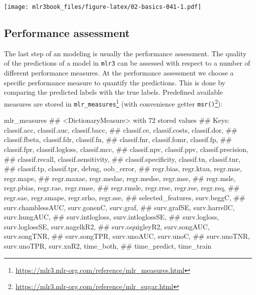 \documentclass[12pt,]{scrbook}
\newenvironment{Shaded}{}{}
\newcommand{\NormalTok}[1]{#1}
\renewcommand{\href}[2]{#2\footnote{\url{#1}}}
\begin{document}
\texttt{[image: mlr3book\_files/figure-latex/02-basics-041-1.pdf]}

\hypertarget{measure}{%
\subsection{Performance assessment}\label{measure}}

The last step of an modeling is usually the performance assessment.
The quality of the predictions of a model in \texttt{mlr3} can be assessed with respect to a number of different performance measures.
At the performance assessment we choose a specific performance measure to quantify the predictions.
This is done by comparing the predicted labels with the true labels.
Predefined available measures are stored in \href{https://mlr3.mlr-org.com/reference/mlr_measures.html}{\texttt{mlr\_measures}} (with convenience getter \href{https://mlr3.mlr-org.com/reference/mlr_sugar.html}{\texttt{msr()}}):

\begin{Shaded}
\begin{Highlighting}[]
\NormalTok{mlr_measures}
\NormalTok{## <DictionaryMeasure> with 72 stored values}
\NormalTok{## Keys: classif.acc, classif.auc, classif.bacc,}
\NormalTok{##   classif.ce, classif.costs, classif.dor,}
\NormalTok{##   classif.fbeta, classif.fdr, classif.fn,}
\NormalTok{##   classif.fnr, classif.fomr, classif.fp,}
\NormalTok{##   classif.fpr, classif.logloss, classif.mcc,}
\NormalTok{##   classif.npv, classif.ppv, classif.precision,}
\NormalTok{##   classif.recall, classif.sensitivity,}
\NormalTok{##   classif.specificity, classif.tn, classif.tnr,}
\NormalTok{##   classif.tp, classif.tpr, debug, oob_error,}
\NormalTok{##   regr.bias, regr.ktau, regr.mae, regr.mape,}
\NormalTok{##   regr.maxae, regr.medae, regr.medse, regr.mse,}
\NormalTok{##   regr.msle, regr.pbias, regr.rae, regr.rmse,}
\NormalTok{##   regr.rmsle, regr.rrse, regr.rse, regr.rsq,}
\NormalTok{##   regr.sae, regr.smape, regr.srho, regr.sse,}
\NormalTok{##   selected_features, surv.beggC,}
\NormalTok{##   surv.chamblessAUC, surv.gonenC, surv.graf,}
\NormalTok{##   surv.grafSE, surv.harrellC, surv.hungAUC,}
\NormalTok{##   surv.intlogloss, surv.intloglossSE,}
\NormalTok{##   surv.logloss, surv.loglossSE, surv.nagelkR2,}
\NormalTok{##   surv.oquigleyR2, surv.songAUC, surv.songTNR,}
\NormalTok{##   surv.songTPR, surv.unoAUC, surv.unoC,}
\NormalTok{##   surv.unoTNR, surv.unoTPR, surv.xuR2, time_both,}
\NormalTok{##   time_predict, time_train}
\end{Highlighting}
\end{Shaded}
\end{document}
